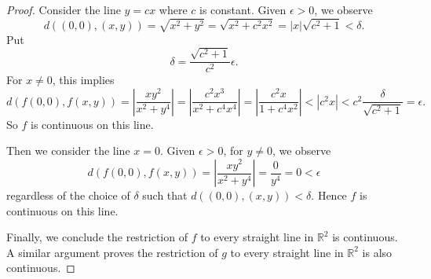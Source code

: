 \begin{Exercise}
\begin{proof}
		Consider the line $y = c x$ where $c$ is constant. Given $\epsilon>0$, we observe
		$$
		d((0,0), (x,y))
		= \sqrt{x^2+y^2} 
		= \sqrt{x^2 + c^2 x^2}
		= |x| \sqrt{c^2+1}
		< \delta.
		$$
		Put
		$$
		\delta = \frac{\sqrt{c^2+1}}{c^2}\epsilon.
		$$
		For $x\neq 0$, this implies
		$$
		d(f(0,0), f(x,y))
		= \left| \frac{x y^2}{x^2+y^4} \right|
		= \left| \frac{c^2 x^3}{x^2+c^4 x^4} \right|
		= \left| \frac{c^2 x}{1+c^4 x^2} \right|
		< |c^2 x|
		< c^2 \frac{\delta}{\sqrt{c^2+1}}
		= \epsilon.
		$$
		So $f$ is continuous on this line.
		
		Then we consider the line $x=0$. Given $\epsilon>0$, for $y\neq 0$, we observe
		$$
		d(f(0,0),f(x,y))
		= \left| \frac{x y^2}{x^2+y^4} \right|
		= \frac{0}{y^4}
		= 0
		< \epsilon
		$$
		regardless of the choice of $\delta$ such that $d((0,0),(x,y))<\delta$. Hence $f$ is continuous on this line.
		
		Finally, we conclude the restriction of $f$ to every straight line in $\mathbb{R}^2$ is continuous. A similar argument proves the restriction of $g$ to every straight line in $\mathbb{R}^2$ is also continuous.
	\end{proof}
\end{Exercise}